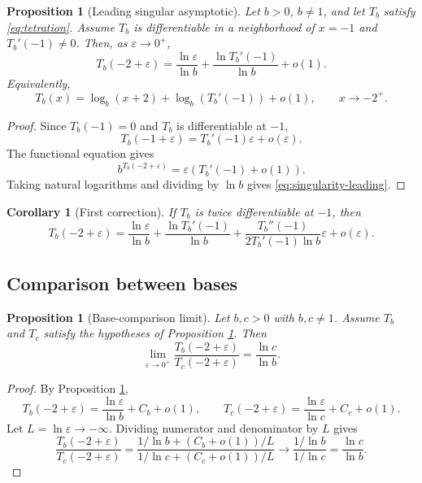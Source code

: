 \documentclass[11pt,a4paper]{article}
\theoremstyle{plain}
\newtheorem{proposition}[theorem]{Proposition}
\newtheorem{corollary}[theorem]{Corollary}
\theoremstyle{definition}
\theoremstyle{remark}
\begin{document}
\begin{proposition}[Leading singular asymptotic]\label{prop:singularity-leading}
Let $b>0$, $b\ne1$, and let $T_b$ satisfy \eqref{eq:tetration}.  Assume $T_b$ is differentiable in a neighborhood of $x=-1$ and $T_b'(-1)\ne0$.  Then, as $\varepsilon\to0^+$,
\begin{equation}\label{eq:singularity-leading}
  T_b(-2+\varepsilon)=\frac{\ln\varepsilon}{\ln b}+\frac{\ln T_b'(-1)}{\ln b}+o(1).
\end{equation}
Equivalently,
\[
  T_b(x)=\log_b(x+2)+\log_b(T_b'(-1))+o(1),\qquad x\to-2^+.
\]
\end{proposition}

\begin{proof}
Since $T_b(-1)=0$ and $T_b$ is differentiable at $-1$,
\[
  T_b(-1+\varepsilon)=T_b'(-1)\varepsilon+o(\varepsilon).
\]
The functional equation gives
\[
  b^{T_b(-2+\varepsilon)}=\varepsilon\left(T_b'(-1)+o(1)\right).
\]
Taking natural logarithms and dividing by $\ln b$ gives \eqref{eq:singularity-leading}.
\end{proof}

\begin{corollary}[First correction]\label{cor:singularity-correction}
If $T_b$ is twice differentiable at $-1$, then
\begin{equation}\label{eq:singularity-correction}
  T_b(-2+\varepsilon)=\frac{\ln\varepsilon}{\ln b}+\frac{\ln T_b'(-1)}{\ln b}
  +\frac{T_b''(-1)}{2T_b'(-1)\ln b}\varepsilon+o(\varepsilon).
\end{equation}
\end{corollary}

\subsection{Comparison between bases}

\begin{proposition}[Base-comparison limit]\label{prop:base-comparison}
Let $b,c>0$ with $b,c\ne1$.  Assume $T_b$ and $T_c$ satisfy the hypotheses of Proposition \ref{prop:singularity-leading}.  Then
\begin{equation}\label{eq:base-comparison}
  \lim_{\varepsilon\to0^+}\frac{T_b(-2+\varepsilon)}{T_c(-2+\varepsilon)}=\frac{\ln c}{\ln b}.
\end{equation}
\end{proposition}

\begin{proof}
By Proposition \ref{prop:singularity-leading},
\[
  T_b(-2+\varepsilon)=\frac{\ln\varepsilon}{\ln b}+C_b+o(1),
  \qquad
  T_c(-2+\varepsilon)=\frac{\ln\varepsilon}{\ln c}+C_c+o(1).
\]
Let $L=\ln\varepsilon\to-\infty$.  Dividing numerator and denominator by $L$ gives
\[
  \frac{T_b(-2+\varepsilon)}{T_c(-2+\varepsilon)}
  =\frac{1/\ln b+(C_b+o(1))/L}{1/\ln c+(C_c+o(1))/L}
  \to\frac{1/\ln b}{1/\ln c}=\frac{\ln c}{\ln b}.
\]
\end{proof}
\end{document}
